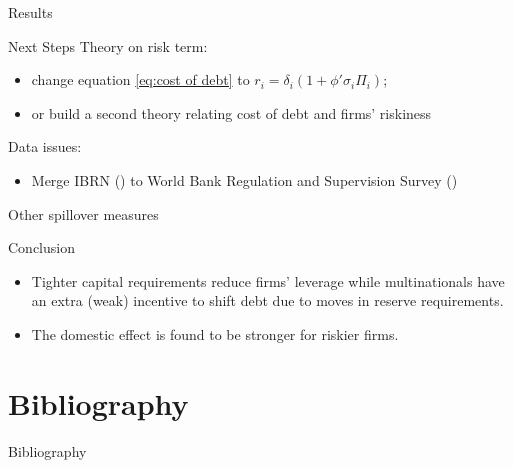 \documentclass{beamer}
\begin{document}
\begin{frame}{Results}
\begin{center}
	\begin{tiny}		
	\end{tiny}
\end{center}
\end{frame}

\begin{frame}{ Next Steps}
Theory on risk term:
\begin{itemize}
\item change equation \ref{eq:cost of debt} to $r_i=\delta_i(1+\phi'\sigma_{i}\Pi_i)$;
\item or build a second theory relating cost of debt and firms' riskiness   
\end{itemize}
Data issues:
\begin{itemize}
	\item Merge IBRN (\cite{cerutti2017changes}) to World Bank Regulation
	and Supervision Survey (\cite{barth2013bank})
\end{itemize}
Other spillover measures

\end{frame}

\begin{frame}{Conclusion}
\begin{itemize}
	\item Tighter capital requirements reduce firms' leverage while multinationals have an extra (weak) incentive to shift debt due to moves in reserve requirements. 
	\item The domestic effect is found to be stronger for riskier firms.

	
\end{itemize}
\end{frame}


\section{Bibliography}
\begin{frame}{Bibliography}{}
\begin{tiny}


\end{tiny}
\end{frame}
\end{document}
